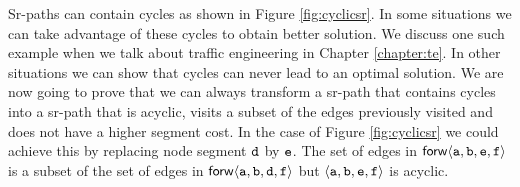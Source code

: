 Sr-paths can contain cycles as shown in Figure \ref{fig:cyclicsr}. In some situations we can take advantage of these
cycles to obtain better solution. We discuss one such example when we talk about traffic engineering in Chapter \ref{chapter:te}. 
In other situations we can show that cycles can never lead to an optimal solution.
We are now going to prove that we can always transform a sr-path that contains cycles into a sr-path that is acyclic,
visits a subset of the edges previously visited and does not have a higher segment cost. 
In the case of Figure \ref{fig:cyclicsr} we could achieve this by replacing node segment $\texttt{d}$ by $\texttt{e}$.
The set of edges in $\mathsf{forw} \langle \texttt{a}, \texttt{b}, \texttt{e}, \texttt{f} \rangle$ is a subset of the set of edges 
in $\mathsf{forw} \langle \texttt{a}, \texttt{b}, \texttt{d}, \texttt{f} \rangle$ but $\langle \texttt{a}, \texttt{b}, \texttt{e}, \texttt{f} \rangle$
is acyclic.

